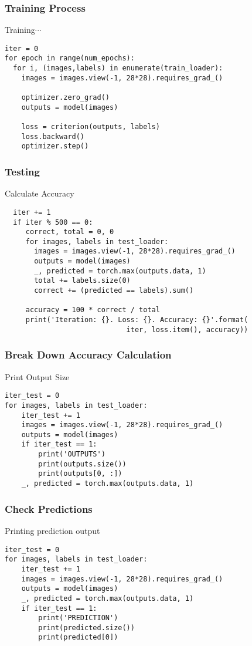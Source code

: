 \documentclass[14 pt]{beamer}
\begin{document}
\begin{frame}[fragile]
  \frametitle{Training Process}
\small{
  \begin{block}{Training$\cdots$}
\begin{verbatim}
iter = 0
for epoch in range(num_epochs):
  for i, (images,labels) in enumerate(train_loader):
    images = images.view(-1, 28*28).requires_grad_()

    optimizer.zero_grad()
    outputs = model(images)

    loss = criterion(outputs, labels)
    loss.backward()
    optimizer.step()
\end{verbatim}
  \end{block}
}
\end{frame}

\begin{frame}[fragile]
  \frametitle{Testing}
\footnotesize{
  \begin{block}{Calculate Accuracy}
\begin{verbatim}
  iter += 1
  if iter % 500 == 0:
     correct, total = 0, 0
     for images, labels in test_loader:
       images = images.view(-1, 28*28).requires_grad_()
       outputs = model(images)
       _, predicted = torch.max(outputs.data, 1)
       total += labels.size(0)
       correct += (predicted == labels).sum()

     accuracy = 100 * correct / total
     print('Iteration: {}. Loss: {}. Accuracy: {}'.format(
                             iter, loss.item(), accuracy))
\end{verbatim}
  \end{block}
}
\end{frame} 

\begin{frame}[fragile]
  \frametitle{Break Down Accuracy Calculation}
\small{
  \begin{block}{Print Output Size}
\begin{verbatim}
iter_test = 0
for images, labels in test_loader:
    iter_test += 1
    images = images.view(-1, 28*28).requires_grad_()
    outputs = model(images)
    if iter_test == 1:
        print('OUTPUTS')
        print(outputs.size())
        print(outputs[0, :])
    _, predicted = torch.max(outputs.data, 1)
\end{verbatim}
  \end{block}
}
\end{frame}

\begin{frame}[fragile]
  \frametitle{Check Predictions}
\small{
  \begin{block}{Printing prediction output}
\begin{verbatim}
iter_test = 0
for images, labels in test_loader:
    iter_test += 1
    images = images.view(-1, 28*28).requires_grad_()
    outputs = model(images)
    _, predicted = torch.max(outputs.data, 1)
    if iter_test == 1:
        print('PREDICTION')
        print(predicted.size())
        print(predicted[0])
\end{verbatim}
  \end{block}
}
\end{frame}
\end{document}
